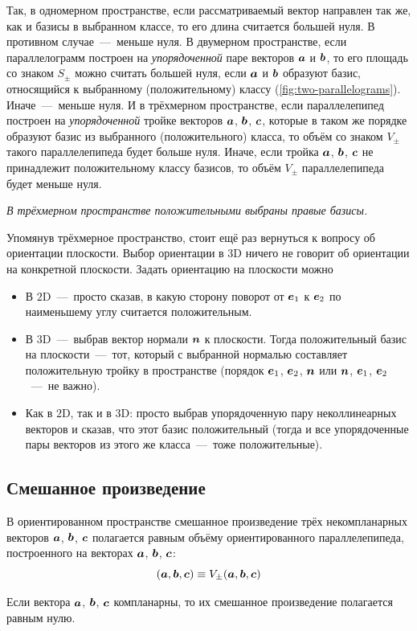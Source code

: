 \documentclass[a4paper,12pt]{article}
\begin{document}
  Так, в одномерном пространстве, если рассматриваемый вектор направлен так же, как и базисы в выбранном классе, то его длина считается большей нуля.
  В противном случае~---~меньше нуля.
  В двумерном пространстве, если параллелограмм построен на \emph{упорядоченной} паре векторов $\boldsymbol a$ и $\boldsymbol b$, то его площадь со знаком $S_{\pm}$ можно считать большей нуля, если $\boldsymbol a$ и $\boldsymbol b$ образуют базис, относящийся к выбранному (положительному) классу (\ref{fig:two-parallelograms}).
  Иначе~---~меньше нуля.
  И в трёхмерном пространстве, если параллелепипед построен на \emph{упорядоченной} тройке векторов $\boldsymbol a$, $\boldsymbol b$, $\boldsymbol c$, которые в таком же порядке образуют базис из выбранного (положительного) класса, то объём со знаком $V_{\pm}$ такого параллелепипеда будет больше нуля.
  Иначе, если тройка $\boldsymbol a$, $\boldsymbol b$, $\boldsymbol c$ не принадлежит положительному классу базисов, то объём $V_{\pm}$ параллелепипеда будет меньше нуля.
  
  \emph{В трёхмерном пространстве положительными выбраны правые базисы.}
  
  Упомянув трёхмерное пространство, стоит ещё раз вернуться к вопросу об ориентации плоскости.
  Выбор ориентации в $3$D ничего не говорит об ориентации на конкретной плоскости.
  Задать ориентацию на плоскости можно
  \begin{itemize}
    \item В $2$D~---~просто сказав, в какую сторону поворот от $\boldsymbol e_1$ к $\boldsymbol e_2$ по наименьшему углу считается положительным.
    
    \item В $3$D~---~выбрав вектор нормали $\boldsymbol n$ к плоскости.
    Тогда положительный базис на плоскости~---~тот, который с выбранной нормалью составляет положительную тройку в пространстве (порядок $\boldsymbol e_1$, $\boldsymbol e_2$, $\boldsymbol n$ или $\boldsymbol n$, $\boldsymbol e_1$, $\boldsymbol e_2$~---~не важно).
    
    \item Как в $2$D, так и в $3$D: просто выбрав упорядоченную пару неколлинеарных векторов и сказав, что этот базис положительный (тогда и все упорядоченные пары векторов из этого же класса~---~тоже положительные).
  \end{itemize}

  
  \subsection{Смешанное произведение}
  
  \begin{definition}
    В ориентированном пространстве смешанное произведение трёх некомпланарных векторов $\boldsymbol a$, $\boldsymbol b$, $\boldsymbol c$ полагается равным объёму ориентированного параллелепипеда, построенного на векторах $\boldsymbol a$, $\boldsymbol b$, $\boldsymbol c$:
    \[
      (\boldsymbol a, \boldsymbol b, \boldsymbol c) \equiv V_{\pm}(\boldsymbol a, \boldsymbol b, \boldsymbol c)
    \]
    
    Если вектора $\boldsymbol a$, $\boldsymbol b$, $\boldsymbol c$ компланарны, то их смешанное произведение полагается равным нулю.
  \end{definition}
  
\end{document}
